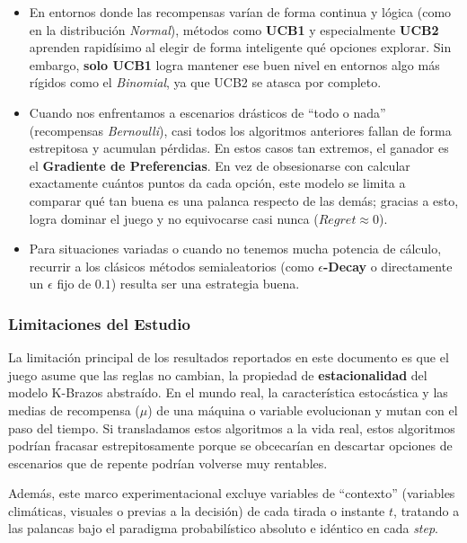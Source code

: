 \begin{itemize}

\item
  En entornos donde las recompensas varían de forma continua y lógica
  (como en la distribución \emph{Normal}), métodos como \textbf{UCB1} y
  especialmente \textbf{UCB2} aprenden rapidísimo al elegir de forma
  inteligente qué opciones explorar. Sin embargo, \textbf{solo UCB1}
  logra mantener ese buen nivel en entornos algo más rígidos como el
  \emph{Binomial}, ya que UCB2 se atasca por completo.
\item
  Cuando nos enfrentamos a escenarios drásticos de ``todo o nada''
  (recompensas \emph{Bernoulli}), casi todos los algoritmos anteriores
  fallan de forma estrepitosa y acumulan pérdidas. En estos casos tan
  extremos, el ganador es el \textbf{Gradiente de Preferencias}. En vez
  de obsesionarse con calcular exactamente cuántos puntos da cada
  opción, este modelo se limita a comparar qué tan buena es una palanca
  respecto de las demás; gracias a esto, logra dominar el juego y no
  equivocarse casi nunca (\(Regret \approx 0\)).
\item
  Para situaciones variadas o cuando no tenemos mucha potencia de
  cálculo, recurrir a los clásicos métodos semialeatorios (como
  \textbf{\(\epsilon\)-Decay} o directamente un \(\epsilon\) fijo de
  \(0.1\)) resulta ser una estrategia buena.
\end{itemize}

\subsubsection{Limitaciones del Estudio}\label{limitaciones-del-estudio}

La limitación principal de los resultados reportados en este documento
es que el juego asume que las reglas no cambian, la propiedad de
\textbf{estacionalidad} del modelo K-Brazos abstraído. En el mundo real,
la característica estocástica y las medias de recompensa (\(\mu\)) de
una máquina o variable evolucionan y mutan con el paso del tiempo. Si
transladamos estos algoritmos a la vida real, estos algoritmos podrían
fracasar estrepitosamente porque se obcecarían en descartar opciones de
escenarios que de repente podrían volverse muy rentables.

Además, este marco experimentacional excluye variables de ``contexto''
(variables climáticas, visuales o previas a la decisión) de cada tirada
o instante \(t\), tratando a las palancas bajo el paradigma
probabilístico absoluto e idéntico en cada \emph{step}.

